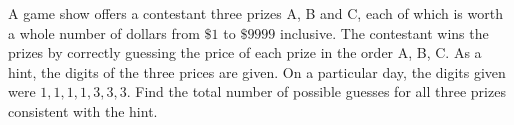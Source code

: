 A game show offers a contestant three prizes A, B and C, each of which is worth a whole number of dollars from $ \$1$ to $ \$9999$ inclusive. The contestant wins the prizes by correctly guessing the price of each prize in the order A, B, C. As a hint, the digits of the three prices are given. On a particular day, the digits given were $ 1, 1, 1, 1, 3, 3, 3$. Find the total number of possible guesses for all three prizes consistent with the hint.
